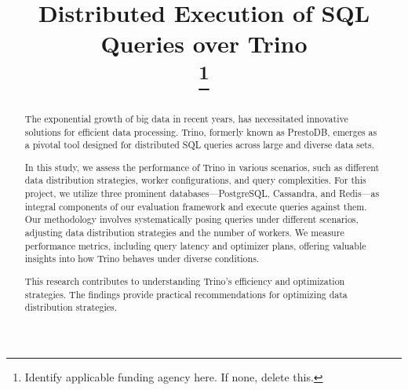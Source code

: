 \documentclass[conference]{IEEEtran}
\begin{document}
\title{Distributed Execution of SQL Queries over Trino \\
\thanks{Identify applicable funding agency here. If none, delete this.}
}

\author{
\and
{}
}

\maketitle

\begin{abstract}

The exponential growth of big data in recent years, has necessitated innovative solutions for efficient
data processing. Trino, formerly known as PrestoDB, emerges as a pivotal tool designed for distributed SQL queries
across large and diverse data sets.

In this study, we assess the performance of Trino in various scenarios, such as different data distribution strategies, 
worker configurations, and query complexities. For this project, we utilize three prominent databases—PostgreSQL, 
Cassandra, and Redis—as integral components of our evaluation framework and execute queries against them. 
Our methodology involves systematically posing queries under different scenarios, adjusting data distribution strategies 
and the number of workers. We measure performance metrics, including query latency and optimizer plans, 
offering valuable insights into how Trino behaves under diverse conditions.

This research contributes to understanding Trino's efficiency and optimization strategies. 
The findings provide practical recommendations for optimizing data distribution strategies.

\end{abstract}
\end{document}
